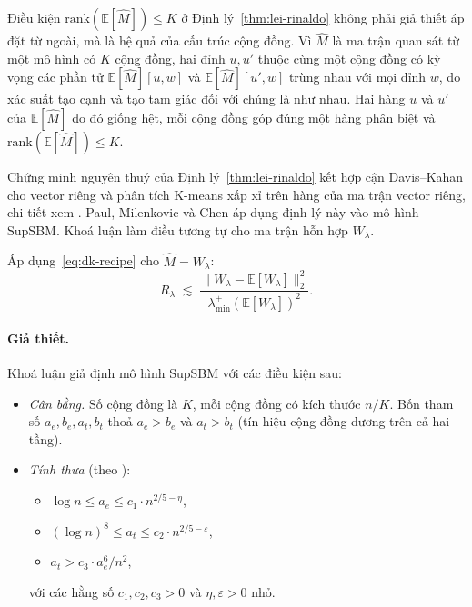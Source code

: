 Điều kiện $\mathrm{rank}(\mathbb{E}[\widehat M]) \leq K$ ở Định lý~\ref{thm:lei-rinaldo} không phải giả thiết áp đặt từ ngoài, mà là hệ quả của cấu trúc cộng đồng. Vì $\widehat M$ là ma trận quan sát từ một mô hình có $K$ cộng đồng, hai đỉnh $u, u'$ thuộc cùng một cộng đồng có kỳ vọng các phần tử $\mathbb{E}[\widehat M][u, w]$ và $\mathbb{E}[\widehat M][u', w]$ trùng nhau với mọi đỉnh $w$, do xác suất tạo cạnh và tạo tam giác đối với chúng là như nhau. Hai hàng $u$ và $u'$ của $\mathbb{E}[\widehat M]$ do đó giống hệt, mỗi cộng đồng góp đúng một hàng phân biệt và $\mathrm{rank}(\mathbb{E}[\widehat M]) \leq K$.

Chứng minh nguyên thuỷ của Định lý~\ref{thm:lei-rinaldo} kết hợp cận Davis--Kahan cho vector riêng và phân tích K-means xấp xỉ trên hàng của ma trận vector riêng, chi tiết xem \cite[Định lý 3.1]{lei2015}. Paul, Milenkovic và Chen \cite{paul2023hosc} áp dụng định lý này vào mô hình SupSBM. Khoá luận làm điều tương tự cho ma trận hỗn hợp $W_\lambda$.

Áp dụng~\eqref{eq:dk-recipe} cho $\widehat M = W_\lambda$:
\begin{equation}
\label{eq:dk-wlambda}
    R_\lambda \;\lesssim\; \frac{\|W_\lambda - \mathbb{E}[W_\lambda]\|_2^2}{\lambda_{\min}^+(\mathbb{E}[W_\lambda])^2}.
\end{equation}

\paragraph{Giả thiết.} Khoá luận giả định mô hình SupSBM với các điều kiện sau:

\begin{itemize}
    \item[(A0)] \emph{Cân bằng.} Số cộng đồng là $K$, mỗi cộng đồng có kích thước $n/K$. Bốn tham số $a_e, b_e, a_t, b_t$ thoả $a_e > b_e$ và $a_t > b_t$ (tín hiệu cộng đồng dương trên cả hai tầng).
    \item[(A1)] \emph{Tính thưa} (theo \cite{paul2023hosc}):
    \begin{itemize}
        \item[(A1a)] $\log n \leq a_e \leq c_1 \cdot n^{2/5 - \eta}$,
        \item[(A1b)] $(\log n)^8 \leq a_t \leq c_2 \cdot n^{2/5 - \varepsilon}$,
        \item[(A1c)] $a_t > c_3 \cdot a_e^6 / n^2$,
    \end{itemize}
    với các hằng số $c_1, c_2, c_3 > 0$ và $\eta, \varepsilon > 0$ nhỏ.
\end{itemize}

